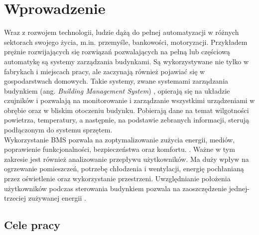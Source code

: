 \chapter{Wprowadzenie}
\label{cha:wprowadzenie}

Wraz z rozwojem technologii, ludzie dążą do pełnej automatyzacji w różnych sektorach swojego życia, m.in. przemyśle, bankowości, motoryzacji. Przykładem prężnie rozwijających się rozwiązań pozwalających na pełną lub częściową automatykę są systemy zarządzania budynkami. Są wykorzystywane nie tylko w fabrykach i miejscach pracy, ale zaczynają również pojawiać się w gospodarstwach domowych. Takie systemy, zwane systemami zarządzania budynkiem (ang. \textit{Building Management System}) \cite{BMS}, opierają się na układzie czujników i pozwalają na monitorowanie i zarządzanie wszystkimi urządzeniami w obrębie oraz w bliskim otoczeniu budynku. Pobierają dane na temat wilgotności powietrza, temperatury, a następnie, na podstawie zebranych informacji, sterują podłączonym do systemu sprzętem.\\
Wykorzystanie BMS pozwala na zoptymalizowanie zużycia energii, mediów, poprawienie funkcjonalności, bezpieczeństwa oraz komfortu. \cite{BMS}. Ważne w tym zakresie jest również analizowanie przepływu użytkowników. Ma duży wpływ na ogrzewanie pomieszczeń, potrzebę chłodzenia i wentylacji, energię pochłanianą przez oświetlenie oraz wykorzystanie przestrzeni. Uwzględnianie położenia użytkowników podczas sterowania budynkiem pozwala na zaoszczędzenie jednej-trzeciej zużywanej energii \cite{BECM}.


\section{Cele pracy}
\label{sec:celePracy}

